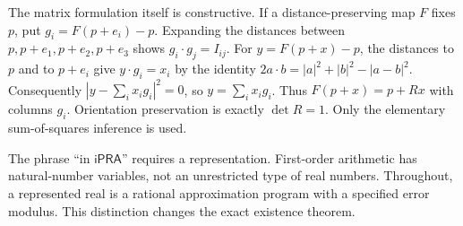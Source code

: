 \documentclass[11pt]{article}
\theoremstyle{definition}\newtheorem{definition}[theorem]{Definition}
\newcommand{\ipra}{\mathsf{iPRA}}
\begin{document}
The matrix formulation itself is constructive. If a distance-preserving
map $F$ fixes $p$, put $g_i=F(p+e_i)-p$. Expanding the distances between
$p,p+e_1,p+e_2,p+e_3$ shows $g_i\cdot g_j=I_{ij}$. For
$y=F(p+x)-p$, the distances to $p$ and to $p+e_i$ give
$y\cdot g_i=x_i$ by the identity
$2a\cdot b=|a|^2+|b|^2-|a-b|^2$. Consequently
$|y-\sum_i x_i g_i|^2=0$, so $y=\sum_i x_i g_i$.
Thus $F(p+x)=p+Rx$ with columns $g_i$. Orientation preservation is
exactly $\det R=1$. Only the elementary sum-of-squares inference is used.

The phrase ``in $\ipra$'' requires a representation. First-order arithmetic has
natural-number variables, not an unrestricted type of real numbers. Throughout,
a represented real is a rational approximation program with a specified error
modulus. This distinction changes the exact existence theorem.
\end{document}
